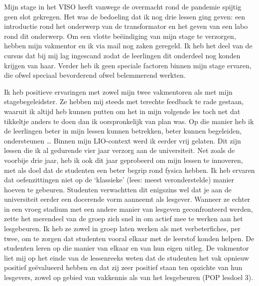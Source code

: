 \documentclass[a4paper,12pt,twoside]{article}%
\begin{document}
Mijn stage in het VISO heeft vanwege de overmacht rond de pandemie spijtig geen slot gekregen. Het was de bedoeling dat ik nog drie lessen ging geven: een introductie rond het onderwerp van de transformator en het geven van een labo rond dit onderwerp. Om een vlotte beëindiging van mijn stage te verzorgen, hebben mijn vakmentor en ik via mail nog zaken geregeld. Ik heb het deel van de cursus dat bij mij lag ingescand zodat de leerlingen dit onderdeel nog konden krijgen van haar. Verder heb ik geen speciale factoren binnen mijn stage ervaren, die ofwel speciaal bevorderend ofwel belemmerend werkten.\newline

Ik heb positieve ervaringen met zowel mijn twee vakmentoren als met mijn stagebegeleidster. Ze hebben mij steeds met terechte feedback te rade gestaan, waaruit ik altijd heb kunnen putten om het in mijn volgende les toch net dat tikkeltje anders te doen dan ik oorspronkelijk van plan was. Op die manier heb ik de leerlingen beter in mijn lessen kunnen betrekken, beter kunnen begeleiden, ondersteunen \ldots{} Binnen mijn LIO-context werd ik eerder vrij gelaten. Dit zijn lessen die ik al gedurende vier jaar verzorg aan de universiteit. Net zoals de voorbije drie jaar, heb ik ook dit jaar geprobeerd om mijn lessen te innoveren, met als doel dat de studenten een beter begrip rond fysica hebben. Ik heb ervaren dat oefenzittingen niet op de `klassieke' (lees: meest veronderstelde) manier hoeven te gebeuren. Studenten verwachtten dit enigszins wel dat je aan de universiteit eerder een docerende vorm aanneemt als lesgever. Wanneer ze echter in een vroeg stadium met een andere manier van lesgeven geconfronteerd werden, zette het merendeel van de groep zich snel in om actief mee te werken aan het lesgebeuren. Ik heb ze zowel in groep laten werken als met verbeterfiches, per twee, om te zorgen dat studenten vooral elkaar met de leerstof konden helpen. De studenten leren op die manier van elkaar en van hun eigen uitleg. De vakmentor liet mij op het einde van de lessenreeks weten dat de studenten het vak opnieuw positief geëvalueerd hebben en dat zij zeer positief staan ten opzichte van hun lesgevers, zowel op gebied van vakkennis als van het lesgebeuren (POP lesdoel 3). \newline\newline
\end{document}
